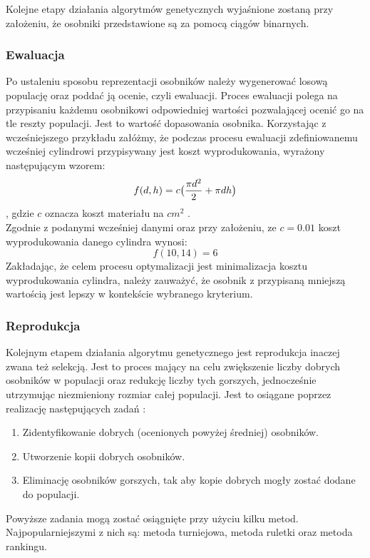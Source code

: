 \documentclass[twoside]{iisthesis}
\begin{document}
Kolejne etapy działania algorytmów genetycznych wyjaśnione zostaną przy założeniu, że osobniki przedstawione są za pomocą ciągów binarnych.
\subsubsection{Ewaluacja}
Po ustaleniu sposobu reprezentacji osobników należy wygenerować losową populację oraz poddać ją ocenie, czyli ewaluacji. Proces ewaluacji polega na przypisaniu każdemu osobnikowi odpowiedniej wartości pozwalającej ocenić go na tle reszty populacji. Jest to wartość dopasowania osobnika. Korzystając z wcześniejszego przykładu załóżmy, że podczas procesu ewaluacji zdefiniowanemu wcześniej cylindrowi przypisywany jest koszt wyprodukowania, wyrażony następującym wzorem:
\begin{equation}
f(d,h) = c\big{(}\dfrac{\pi d^{2}}{2} + \pi dh\big{)}
\end{equation}
, gdzie $c$ oznacza koszt materiału na $cm^{2}$ \cite{book}.\\
Zgodnie z podanymi wcześniej danymi oraz przy założeniu, ze $c = 0.01$ koszt wyprodukowania danego cylindra wynosi:
\[f(10, 14) = 6\]
Zakładając, że celem procesu optymalizacji jest minimalizacja kosztu wyprodukowania cylindra, należy zauważyć, że osobnik z przypisaną mniejszą wartością jest lepszy w kontekście wybranego kryterium.
\subsubsection{Reprodukcja}
Kolejnym etapem działania algorytmu genetycznego jest reprodukcja inaczej zwana też selekcją. Jest to proces mający na celu zwiększenie liczby dobrych osobników w populacji oraz redukcję liczby tych gorszych, jednocześnie utrzymując niezmieniony rozmiar całej populacji. Jest to osiągane poprzez realizację następujących zadań \cite{book}:\\
\begin{enumerate}
	\item Zidentyfikowanie dobrych (ocenionych powyżej średniej) osobników.
	\item Utworzenie kopii dobrych osobników.
	\item Eliminację osobników gorszych, tak aby kopie dobrych mogły zostać dodane do populacji.\\
\end{enumerate}
Powyższe zadania mogą zostać osiągnięte przy użyciu kilku metod. Najpopularniejszymi z nich są: metoda turniejowa, metoda ruletki oraz metoda rankingu.
\end{document}
